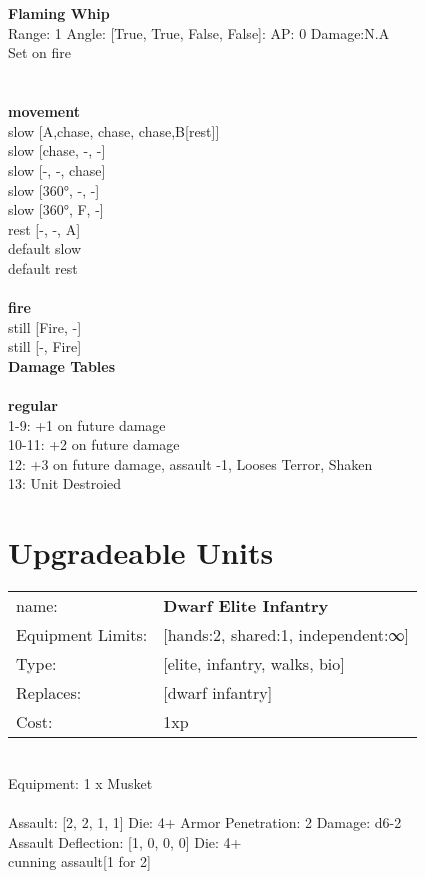 \ \\

\ \\
{\bf Flaming Whip } \\



Range: 1  Angle: [True, True, False, False]: AP: 0 Damage:N.A \\
Set on fire\\ 




 
\ \\



\ \\ {\bf movement } \\
slow [A,chase, chase, chase,B[rest]] \\
slow [chase, -, -] \\
slow [-, -, chase] \\
slow [360°, -, -] \\
slow [360°, F, -] \\
rest [-, -, A] \\
default slow \\
default rest \\
\ \\ {\bf fire } \\
still [Fire, -] \\
still [-, Fire] \\


{\bf Damage Tables} \\
\ \\ {\bf regular } \\
1-9: +1 on future damage \\
10-11: +2 on future damage \\
12: +3 on future damage, assault -1, Looses Terror, Shaken \\
13: Unit Destroied \\










\pagebreak\section{Upgradeable Units}\noindent
\begin{tabular}{ll}
name: &{\bf Dwarf Elite Infantry } \\
Equipment Limits: &[hands:2, shared:1, independent:∞] \\
Type: &[elite, infantry, walks, bio] \\
Replaces: &[dwarf infantry] \\
Cost: & 1xp\\
\end{tabular}
\ \\
Equipment: 1 x Musket \\
\ \\
Assault: [2, 2, 1, 1] Die: 4+ Armor Penetration: 2 Damage: d6-2 \\
Assault Deflection: [1, 0, 0, 0] Die: 4+\\
\indent cunning assault[1 for 2]\\ 
 
